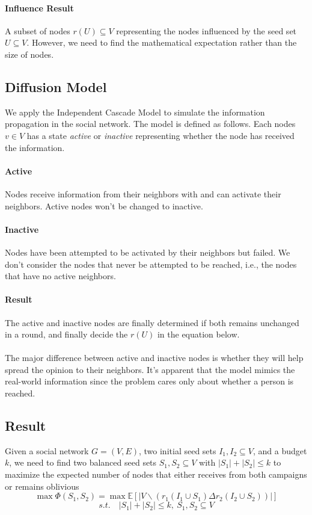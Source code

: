 \documentclass{article}
\begin{document}
\paragraph{Influence Result} A subset of nodes $r(U) \subseteq V$ representing the nodes influenced by the seed set $U \subseteq V$. However, we need to find the mathematical expectation rather than the size of nodes.

\subsection{Diffusion Model}
We apply the Independent Cascade Model to simulate the information propagation in the social network. The model is defined as follows. Each nodes $v \in V$ has a state \textit{active} or \textit{inactive} representing whether the node has received the information.
\paragraph{Active} Nodes receive information from their neighbors with and can activate their neighbors. Active nodes won't be changed to inactive.
\paragraph{Inactive} Nodes have been attempted to be activated by their neighbors but failed. We don't consider the nodes that never be attempted to be reached, i.e., the nodes that have no active neighbors.
\paragraph{Result} The active and inactive nodes are finally determined if both remains unchanged in a round, and finally decide the $r(U)$ in the equation below.

\paragraph{} The major difference between active and inactive nodes is whether they will help spread the opinion to their neighbors. It's apparent that the model mimics the real-world information since the problem cares only about whether a person is reached.

\subsection{Result}

Given a social network $G = (V, E)$, two initial seed sets $I_1, I_2 \subseteq V$, and a budget $k$, we need to find two balanced seed sets $S_1, S_2 \subseteq V$ with $|S_1| + |S_2| \leq k$ to maximize the expected number of nodes that either receives from both campaigns or remains oblivious
\[
    \max \Phi \left( S_1, S_2 \right) = \max \mathbb{E} \left[ |V \backslash (r_1(I_1\cup S_1) \Delta r_2(I_2\cup S_2))| \right]
\]
\[
    s.t.\quad |S_1| + |S_2| \leq k, \  S_1, S_2 \subseteq V
\]
\end{document}
